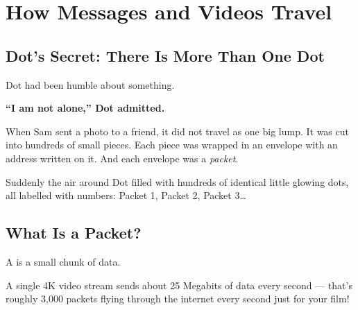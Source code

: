 
\chapter{How Messages and Videos Travel}


\section*{Dot's Secret: There Is More Than One Dot}

Dot had been humble about something.

\begin{center}
  \Large\bfseries\color{InternetBlue}
  ``I am not alone,'' Dot admitted.
\end{center}

When Sam sent a photo to a friend, it did not travel as one big lump.
It was cut into hundreds of small pieces.
Each piece was wrapped in an envelope with an address written on it.
And each envelope was a \emph{packet}.

Suddenly the air around Dot filled with hundreds of identical little glowing dots,
all labelled with numbers: Packet 1, Packet 2, Packet 3\ldots


\sectionrule

\section*{What Is a Packet?}

A  is a small chunk of data.

\begin{funfact}
A single 4K video stream sends about 25 Megabits of data every second — that's roughly 3,000 packets flying through the internet every second just for your film!
\end{funfact}

